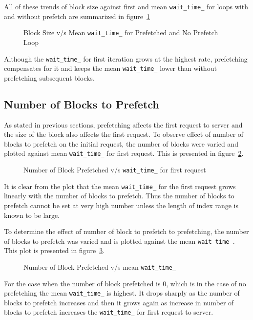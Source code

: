 All of these trends of block size against first and mean \texttt{wait\_time\_} for
loops with and without prefetch are summarized in figure~\ref{fig:block_size_avg_all}
\begin{figure}[h]
  
  \caption{Block Size v/s Mean \texttt{wait\_time\_} for Prefetched and No Prefetch Loop}
  \label{fig:block_size_avg_all}
\end{figure}

Although the \texttt{wait\_time\_} for first iteration grows at the highest rate,
prefetching compensates for it and keeps the mean \texttt{wait\_time\_} lower than
without prefetching subsequent blocks.

\subsection{Number of Blocks to Prefetch}
As stated in previous sections, prefetching affects the first request to server
and the size of the block also affects the first request. To observe effect of
number of blocks to prefetch on the initial request, the number of blocks were
varied and plotted against mean \texttt{wait\_time\_} for first request. This is
presented in figure~\ref{fig:look_ahead_first_wait_time}.
\begin{figure}[h]
  
  \caption{Number of Block Prefetched v/s \texttt{wait\_time\_} for first request}
  \label{fig:look_ahead_first_wait_time}
\end{figure}

It is clear from the plot that the mean \texttt{wait\_time\_} for the first request
grows linearly with the number of blocks to prefetch. Thus the number of blocks
to prefetch cannot be set at very high number unless the length of index range is
known to be large.

To determine the effect of number of block to prefetch to prefetching, the number
of blocks to prefetch was varied and is plotted against the mean \texttt{wait\_time\_}.
This plot is presented in figure~\ref{fig:look_ahead_avg_wait_time}.
\begin{figure}[h]
  
  \caption{Number of Block Prefetched v/s mean \texttt{wait\_time\_}}
  \label{fig:look_ahead_avg_wait_time}
\end{figure}

For the case when the number of block prefetched is 0, which is in the case of no
prefetching the mean \texttt{wait\_time\_} is highest. It drops sharply as the
number of blocks to prefetch increases and then it grows again as increase in number
of blocks to prefetch increases the \texttt{wait\_time\_} for first request to
server.

